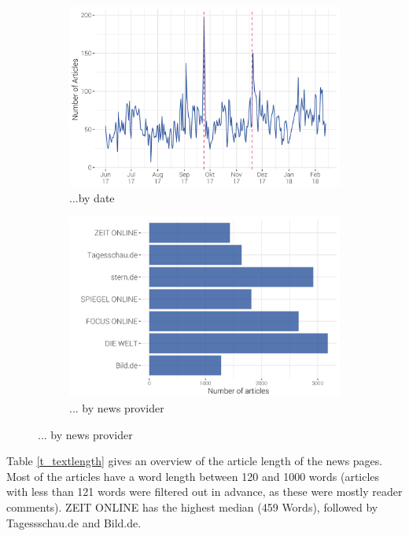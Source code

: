 \documentclass[12pt,a4paper,notitlepage]{article}
\begin{document}
\begin{figure}[H]
	\caption{Article distribution...}
	\begin{center}
		\begin{subfigure}[normla]{0.49\textwidth}
			\includegraphics[width=\textwidth]{figs/timeline.png}
			\caption{...by date}
			\label{fig_distr1}
		\end{subfigure}
		\begin{subfigure}[normla]{0.49\textwidth}
			\includegraphics[width=\textwidth]{figs/bar.png}
			\caption{... by news provider}
			\label{fig_distr2}
		\end{subfigure}
	\end{center}
\end{figure}

Table \ref{t_textlength} gives an overview of the article length of the news pages. Most of the articles have a word length between 120 and 1000 words (articles with less than 121 words were filtered out in advance, as these were mostly reader comments). ZEIT ONLINE has the highest median (459 Words), followed by Tagessschau.de and Bild.de. 
\end{document}
